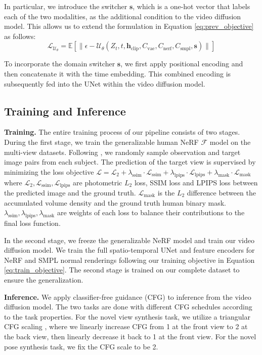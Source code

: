 In particular, we introduce the switcher \( \bm{s} \), which is a one-hot vector that labels each of the two modalities, as the additional condition to the video diffusion model. This allows us to extend the formulation in Equation \ref{eq:prev_objective} as follows:
%
\begin{equation}
    \mathcal{L}_{\mathcal{U}_{\theta}} = \mathbb{E} \left[ \| \epsilon - \mathcal{U}_{\theta} (Z_t, t, \bm{h}_{\text{clip}}, {C}_{\text{vae}}, {C}_{\text{nerf}}, {C}_{\text{smpl}}, \bm{s}) \| \right] 
    \label{eq:train_objective}
\end{equation}


To incorporate the domain switcher \( \bm{s} \), we first apply positional encoding and then concatenate it with the time embedding. This combined encoding is subsequently fed into the UNet within the video diffusion model.



\subsection{Training and Inference}
\noindent \textbf{Training.} The entire training process of our pipeline consists of two stages. During the first stage, we train the generalizable human NeRF $\mathcal{F}$ model on the multi-view datasets. Following \cite{hu2023sherf}, we randomly sample observation and target image pairs from each subject. The prediction of the target view is supervised by minimizing the loss objective $\mathcal{L} = \mathcal{L}_2 + \lambda_{\text{ssim}} \cdot \mathcal{L}_{\text{ssim}} + \lambda_{\text{lpips}} \cdot \mathcal{L}_{\text{lpips}} + \lambda_{\text{mask}} \cdot \mathcal{L}_{\text{mask}}
$
where $\mathcal{L}_2, \mathcal{L}_{\text{ssim}}, \mathcal{L}_{\text{lpips}}$ are photometric \(L_2\) loss, SSIM loss \cite{wang2004image} and LPIPS \cite{zhang2018unreasonable} loss between the predicted image and the ground truth. $\mathcal{L}_{\text{mask}}$ is the \(L_2\) difference between the accumulated volume density and the ground truth human binary mask. $\lambda_{\text{ssim}}, \lambda_{\text{lpips}}, \lambda_{\text{mask}}$ are weights of each loss to balance their contributions to the final loss function. 

In the second stage, we freeze the generalizable NeRF model and train our video diffusion model. We train the full spatio-temporal UNet and feature encoders for NeRF and SMPL normal renderings following our training objective in Equation \ref{eq:train_objective}. The second stage is trained on our complete dataset to ensure the generalization.

\noindent \textbf{Inference.} We apply classifier-free guidance (CFG) \cite{ho2022classifier} to inference from the video diffusion model. The two tasks are done with different CFG schedules according to the task properties. For the novel view synthesis task, we utilize a triangular CFG scaling \cite{voleti2024sv3d}, where we linearly increase CFG from 1 at the front view to 2 at the back view, then linearly decrease it back to 1 at the front view. For the novel pose synthesis task, we fix the CFG scale to be 2.

